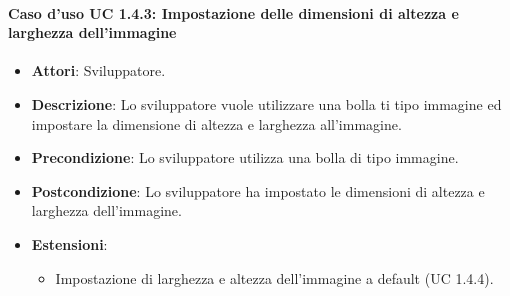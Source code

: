 \paragraph{Caso d'uso UC 1.4.3: Impostazione delle dimensioni di altezza e larghezza dell'immagine}

\FloatBarrier
\begin{itemize}
\item\textbf{Attori}: Sviluppatore.
\item\textbf{Descrizione}: Lo sviluppatore vuole utilizzare una bolla ti tipo immagine ed impostare la dimensione di altezza e larghezza all'immagine.
\item\textbf{Precondizione}: Lo sviluppatore utilizza una bolla di tipo immagine.
\item\textbf{Postcondizione}: Lo sviluppatore ha impostato le dimensioni di altezza e larghezza dell'immagine.
\item \textbf{Estensioni}: 
\begin{itemize}
\item Impostazione di larghezza e altezza dell'immagine a default (UC 1.4.4).
\end{itemize}
\end{itemize}